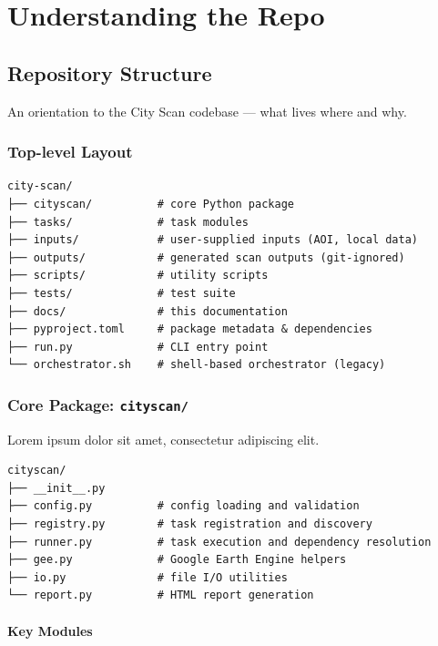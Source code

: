 \documentclass[
  letterpaper,
  DIV=11,
  numbers=noendperiod]{scrreprt}
\begin{document}
\part{Understanding the Repo}

\chapter{Repository Structure}\label{repository-structure}

An orientation to the City Scan codebase --- what lives where and why.

\section{Top-level Layout}\label{top-level-layout}

\begin{verbatim}
city-scan/
├── cityscan/          # core Python package
├── tasks/             # task modules
├── inputs/            # user-supplied inputs (AOI, local data)
├── outputs/           # generated scan outputs (git-ignored)
├── scripts/           # utility scripts
├── tests/             # test suite
├── docs/              # this documentation
├── pyproject.toml     # package metadata & dependencies
├── run.py             # CLI entry point
└── orchestrator.sh    # shell-based orchestrator (legacy)
\end{verbatim}

\section{\texorpdfstring{Core Package:
\texttt{cityscan/}}{Core Package: cityscan/}}\label{core-package-cityscan}

Lorem ipsum dolor sit amet, consectetur adipiscing elit.

\begin{verbatim}
cityscan/
├── __init__.py
├── config.py          # config loading and validation
├── registry.py        # task registration and discovery
├── runner.py          # task execution and dependency resolution
├── gee.py             # Google Earth Engine helpers
├── io.py              # file I/O utilities
└── report.py          # HTML report generation
\end{verbatim}

\subsection{Key Modules}\label{key-modules}
\end{document}
